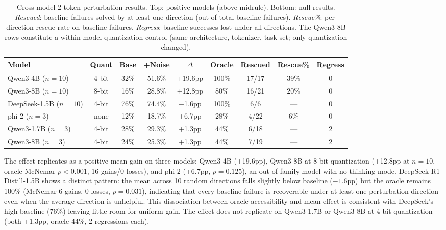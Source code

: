 \documentclass{article}
\begin{document}
\begin{table}[h]
\centering
\small
\begin{tabular}{lcccccccc}
\toprule
\textbf{Model} & \textbf{Quant} & \textbf{Base} & \textbf{+Noise} & \textbf{$\Delta$} & \textbf{Oracle} & \textbf{Rescued} & \textbf{Rescue\%} & \textbf{Regress} \\
\midrule
Qwen3-4B ($n{=}10$) & 4-bit & 32\% & 51.6\% & +19.6pp & 100\% & 17/17 & 39\% & 0 \\
Qwen3-8B ($n{=}10$) & 8-bit & 16\% & 28.8\% & +12.8pp & 80\% & 16/21 & 20\% & 0 \\
DeepSeek-1.5B ($n{=}10$) & 4-bit & 76\% & 74.4\% & $-$1.6pp & 100\% & 6/6 & --- & 0 \\
phi-2 ($n{=}3$) & none & 12\% & 18.7\% & +6.7pp & 28\% & 4/22 & 6\% & 0 \\
\midrule
Qwen3-1.7B ($n{=}3$) & 4-bit & 28\% & 29.3\% & +1.3pp & 44\% & 6/18 & --- & 2 \\
Qwen3-8B ($n{=}3$) & 4-bit & 24\% & 25.3\% & +1.3pp & 44\% & 7/19 & --- & 2 \\
\bottomrule
\end{tabular}
\caption{Cross-model 2-token perturbation results. Top: positive models
(above midrule). Bottom: null results. \emph{Rescued}: baseline
failures solved by at least one direction (out of total baseline failures).
\emph{Rescue\%}: per-direction rescue rate on baseline failures.
\emph{Regress}: baseline successes lost under all directions.
The Qwen3-8B rows constitute a within-model quantization control
(same architecture, tokenizer, task set; only quantization changed).}
\label{tab:crossmodel}
\end{table}

The effect replicates as a positive mean gain on three models: Qwen3-4B
(+19.6pp), Qwen3-8B at 8-bit quantization (+12.8pp at $n{=}10$,
oracle McNemar $p < 0.001$, 16 gains/0 losses),
and phi-2 (+6.7pp, $p = 0.125$), an out-of-family model with no thinking
mode. DeepSeek-R1-Distill-1.5B shows a distinct pattern: the mean across
10 random directions falls slightly below baseline ($-1.6$pp) but the
oracle remains 100\% (McNemar 6 gains, 0 losses, $p = 0.031$), indicating
that every baseline failure is recoverable under at least one perturbation
direction even when the average direction is unhelpful. This dissociation
between oracle accessibility and mean effect is consistent with
DeepSeek's high baseline (76\%) leaving little room for uniform gain.
The effect does not replicate on Qwen3-1.7B or Qwen3-8B at 4-bit
quantization (both +1.3pp, oracle 44\%, 2 regressions each).
\end{document}
